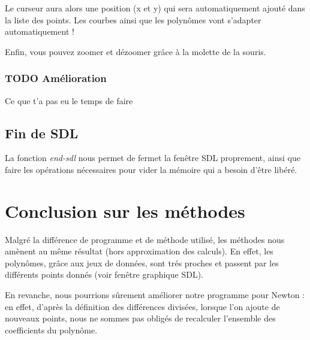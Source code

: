 \documentclass[letter]{article}
\begin{document}
Le curseur aura alors une position (x et y) qui sera automatiquement ajouté dans la liste des points. Les courbes ainsi que les polynômes vont s'adapter automatiquement !


Enfin, vous pouvez zoomer et dézoomer grâce à la molette de la souris.

\subsubsection{{\bfseries\sffamily TODO} Amélioration}
\label{sec:org675f11b}

Ce que t'a pas eu le temps de faire

\subsection{Fin de SDL}
\label{sec:org1719144}

La fonction \emph{end-sdl} nous permet de fermet la fenêtre SDL proprement, ainsi que faire les opérations nécessaires pour vider la mémoire qui a besoin d'être libéré.

\section{Conclusion sur les méthodes}
\label{sec:org17e5e10}

Malgré la différence de programme et de méthode utilisé, les méthodes nous amènent au même résultat (hors approximation des calculs). En effet, les polynômes, grâce aux jeux de données, sont trés proches et passent par les différents points donnés (voir fenêtre graphique SDL).

En revanche, nous pourrions sûrement améliorer notre programme pour Newton : en effet, d'après la définition des différences divisées, lorsque l'on ajoute de nouveaux points, nous ne sommes pas obligés de recalculer l'ensemble des coefficients du polynôme.
\end{document}
